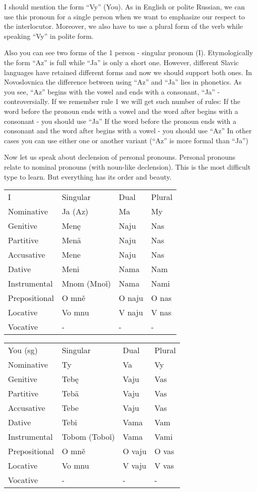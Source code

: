 I should mention the form “Vy” (You). As in English or polite Russian, we can use this pronoun for a single person when we want to emphasize our respect to the interlocutor. Moreover, we also have to use a plural form of the verb while speaking “Vy” in polite form.

Also you can see two forms of the 1 person - singular pronoun (I). Etymologically the form “Az” is full while “Ja” is only a short one. However, different Slavic languages have retained different forms and now we should support both ones. In Novoslovnica the difference between using “Az” and “Ja” lies in phonetics. As you see, “Az” begins with the vowel and ends with a consonant, “Ja” - controversially. If we remember rule 1 we will get such number of rules:
If the word before the pronoun ends with a vowel and the word after begins with a consonant - you should use “Ja”
If the word before the pronoun ends with a consonant and the word after begins with a vowel - you should use “Az”
In other cases you can use either one or another variant (“Az” is more formal than “Ja”)

Now let us speak about declension of personal pronouns. Personal pronouns relate to nominal pronouns (with noun-like declension). This is the most difficult type to learn. But everything has its order and beauty.


\begin{table}
	\begin{tabular}{llll}
		I & Singular & Dual & Plural \\
		Nominative & Ja (Az) & Ma & My \\
		Genitive & Menę & Naju & Nas \\
		Partitive & Menä & Naju & Nas \\
		Accusative & Mene & Naju & Nas \\
		Dative & Meni & Nama & Nam \\
		Instrumental & Mnom (Mnoǐ) & Nama & Nami \\
		Prepositional & O mně & O naju & O nas \\
		Locative & Vo mnu & V naju & V nas \\
		Vocative & - & - & -
	\end{tabular}
\end{table}

\begin{table}
	\begin{tabular}{llll}
		You (sg) & Singular & Dual & Plural \\
		Nominative & Ty & Va & Vy \\
		Genitive & Tebę & Vaju & Vas \\
		Partitive & Tebä & Vaju & Vas \\
		Accusative & Tebe & Vaju & Vas \\
		Dative & Tebi & Vama & Vam \\
		Instrumental & Tobom (Toboǐ) & Vama & Vami \\
		Prepositional & O mně & O vaju & O vas \\
		Locative & Vo mnu & V vaju & V vas \\
		Vocative & - & - & -
	\end{tabular}
\end{table}

